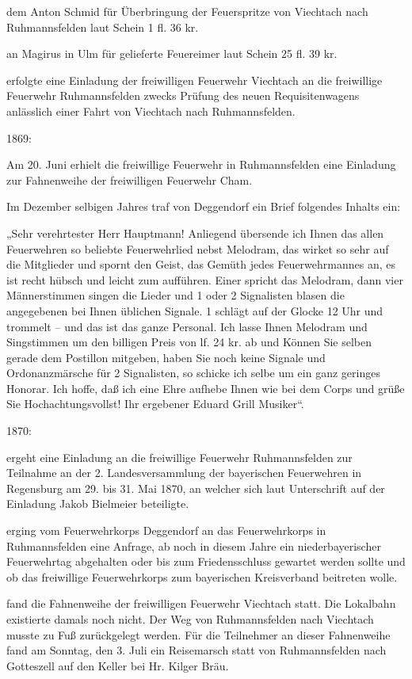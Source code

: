 \documentclass{book}
\begin{document}
dem Anton Schmid für Überbringung der Feuerspritze von Viechtach nach
Ruhmannsfelden laut Schein 1 fl. 36 kr.

an Magirus in Ulm für gelieferte Feuereimer laut Schein 25 fl. 39 kr.

erfolgte eine Einladung der freiwilligen Feuerwehr Viechtach an die freiwillige
Feuerwehr Ruhmannsfelden zwecks Prüfung des neuen Requisitenwagens anlässlich
einer Fahrt von Viechtach nach Ruhmannsfelden.

1869:

Am 20. Juni erhielt die freiwillige Feuerwehr in Ruhmannsfelden eine Einladung
zur Fahnenweihe der freiwilligen Feuerwehr Cham.

Im Dezember selbigen Jahres traf von Deggendorf ein Brief folgendes Inhalts ein:

„Sehr verehrtester Herr Hauptmann! Anliegend übersende ich Ihnen das allen
Feuerwehren so beliebte Feuerwehrlied nebst Melodram, das wirket so sehr auf die
Mitglieder und spornt den Geist, das Gemüth jedes Feuerwehrmannes an, es ist
recht hübsch und leicht zum aufführen. Einer spricht das Melodram, dann vier
Männerstimmen singen die Lieder und 1 oder 2 Signalisten blasen die angegebenen
bei Ihnen üblichen Signale. 1 schlägt auf der Glocke 12 Uhr und trommelt – und
das ist das ganze Personal. Ich lasse Ihnen Melodram und Singstimmen um den
billigen Preis von lf. 24 kr. ab und Können Sie selben gerade dem Postillon
mitgeben, haben Sie noch keine Signale und Ordonanzmärsche für 2 Signalisten, so
schicke ich selbe um ein ganz geringes Honorar. Ich hoffe, daß ich eine Ehre
aufhebe Ihnen wie bei dem Corps und grüße Sie Hochachtungsvollst! Ihr ergebener
Eduard Grill Musiker“.

1870:

ergeht eine Einladung an die freiwillige Feuerwehr Ruhmannsfelden zur Teilnahme
an der 2. Landesversammlung der bayerischen Feuerwehren in Regensburg am 29. bis
31. Mai 1870, an welcher sich laut Unterschrift auf der Einladung Jakob
Bielmeier beteiligte.

erging vom Feuerwehrkorps Deggendorf an das Feuerwehrkorps in Ruhmannsfelden
eine Anfrage, ab noch in diesem Jahre ein niederbayerischer Feuerwehrtag
abgehalten oder bis zum Friedensschluss gewartet werden sollte und ob das
freiwillige Feuerwehrkorps zum bayerischen Kreisverband beitreten wolle.

fand die Fahnenweihe der freiwilligen Feuerwehr Viechtach statt. Die Lokalbahn
existierte damals noch nicht. Der Weg von Ruhmannsfelden nach Viechtach musste
zu Fuß zurückgelegt werden. Für die Teilnehmer an dieser Fahnenweihe fand am
Sonntag, den 3. Juli ein Reisemarsch statt von Ruhmannsfelden nach Gotteszell
auf den Keller bei Hr. Kilger Bräu.
\end{document}
